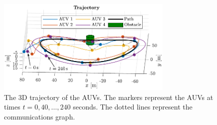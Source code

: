 \begin{figure}[!ht]
    \centering
    \includegraphics[width=0.75\textwidth]{figures/distr_NSB/sim_trajectory.pdf}
    \vspace{-4mm}
    \caption{The 3D trajectory of the AUVs. The markers represent the AUVs at times $t = 0, 40, \ldots, 240$ seconds. The dotted lines represent the communications graph.}
    \label{fig:distr_NSB_sim_trajectory}
\end{figure}
